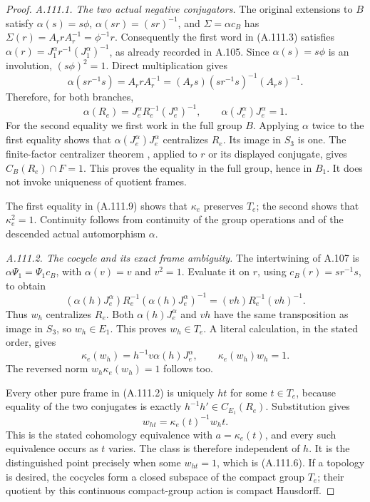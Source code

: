 \begin{proof}
\emph{A.111.1. The two actual negative conjugators.}
The original extensions to \(B\) satisfy
\(\alpha(s)=s\phi\), \(\alpha(sr)=(sr)^{-1}\), and
\(\Sigma=\alpha c_B\) has
\(\Sigma(r)=A_rrA_r^{-1}=\phi^{-1}r\).
Consequently the first word in (A.111.3) satisfies
\(\alpha(r)=J_1^{\alpha}r^{-1}(J_1^{\alpha})^{-1}\),
as already recorded in A.105. Since \(\alpha(s)=s\phi\)
is an involution, \((s\phi)^2=1\). Direct multiplication gives
\[
 \alpha(sr^{-1}s)=A_rrA_r^{-1}
      =(A_rs)(sr^{-1}s)^{-1}(A_rs)^{-1}.
\]
Therefore, for both branches,
\[
 \alpha(R_e)=J_e^{\alpha}R_e^{-1}(J_e^{\alpha})^{-1},
 \qquad \alpha(J_e^{\alpha})J_e^{\alpha}=1.
\tag{A.111.9}
\]
For the second equality we first work in the full group \(B\).
Applying \(\alpha\) twice to the first equality shows that
\(\alpha(J_e^{\alpha})J_e^{\alpha}\) centralizes \(R_e\).
Its image in \(S_3\) is one. The finite-factor centralizer
theorem \cite[Theorem B']{A_HR1985}, applied to \(r\) or its
displayed conjugate, gives \(C_B(R_e)\cap F=1\).
This proves the equality in the full group, hence in \(B_1\).
It does not invoke uniqueness of quotient frames.

The first equality in (A.111.9) shows that \(\kappa_e\) preserves
\(T_e\); the second shows that \(\kappa_e^2=1\).
Continuity follows from continuity of the group operations and
of the descended actual automorphism \(\alpha\).

\emph{A.111.2. The cocycle and its exact frame ambiguity.}
The intertwining of A.107 is
\(\alpha\Psi_1=\Psi_1c_B\), with \(\alpha(v)=v\)
and \(v^2=1\). Evaluate it on \(r\), using
\(c_B(r)=sr^{-1}s\), to obtain
\[
 (\alpha(h)J_e^{\alpha})R_e^{-1}
       (\alpha(h)J_e^{\alpha})^{-1}
       =(vh)R_e^{-1}(vh)^{-1}.
\tag{A.111.10}
\]
Thus \(w_h\) centralizes \(R_e\). Both
\(\alpha(h)J_e^{\alpha}\) and \(vh\) have the same
transposition as image in \(S_3\), so \(w_h\in E_1\).
This proves \(w_h\in T_e\). A literal calculation, in the
stated order, gives
\[
 \kappa_e(w_h)=h^{-1}v\alpha(h)J_e^{\alpha},
 \qquad \kappa_e(w_h)w_h=1.
\tag{A.111.11}
\]
The reversed norm \(w_h\kappa_e(w_h)=1\) follows too.

Every other pure frame in (A.111.2) is uniquely \(ht\) for
some \(t\in T_e\), because equality of the two conjugates
is exactly \(h^{-1}h'\in C_{E_1}(R_e)\). Substitution gives
\[
              w_{ht}=\kappa_e(t)^{-1}w_ht.
\tag{A.111.12}
\]
This is the stated cohomology equivalence with
\(a=\kappa_e(t)\), and every such equivalence occurs as
\(t\) varies. The class is therefore independent of \(h\).
It is the distinguished point precisely when some \(w_{ht}=1\),
which is (A.111.6). If a topology is desired, the cocycles form a
closed subspace of the compact group \(T_e\); their quotient by
this continuous compact-group action is compact Hausdorff.


\end{proof}
